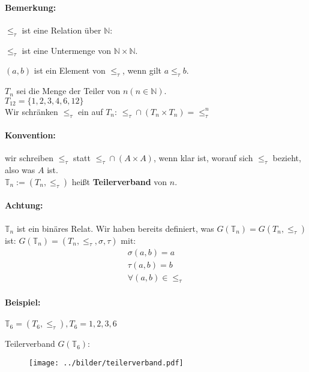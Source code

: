 \paragraph{Bemerkung:}
$\le_\tau$ ist eine Relation über $\mathbb{N}$:

$\le_\tau $ ist eine Untermenge von $\mathbb{N} \times \mathbb{N}$.

$(a,b) $ ist ein Element von $\le_\tau$, wenn gilt $a \le_\tau b$.



\noindent $T_n$ sei die Menge der Teiler von $n (n \in \mathbb{N})$. \\  $T_{12} = \{ 1, 2, 3, 4, 6, 12 \}$ \\

\noindent Wir schränken $\le_\tau$ ein auf $T_n$: $\le_\tau \cap (T_n \times T_n) = \le_\tau^n$

\paragraph{Konvention:} wir schreiben $\le_\tau$ statt $\le_\tau \cap (A \times A)$, wenn klar ist, worauf sich $\le_\tau$ bezieht, also was $A$ ist. \\

\noindent $\mathbb{T}_n := (T_n, \le_\tau)$ heißt {\bf Teilerverband} von $n$.

\paragraph{Achtung:} $\mathbb{T}_n$ ist ein binäres Relat. Wir haben
bereits definiert, was $G (\mathbb{T}_n) = G (T_n, \le_\tau)$ ist:
$G (\mathbb{T}_n) = (T_n, \le_\tau, \sigma, \tau) \text{ mit:}$
\begin{align*}
\sigma (a, b) = a\\
\tau (a, b) = b\\
\forall (a, b) \in \le_\tau
\end{align*}

\paragraph{Beispiel:} $\mathbb{T}_6 = (T_6, \le_\tau), T_6 = { 1, 2, 3, 6}$

Teilerverband $G (\mathbb{T}_6) $:
\begin{figure}[h]
  \texttt{[image: ../bilder/teilerverband.pdf]}
\end{figure}

